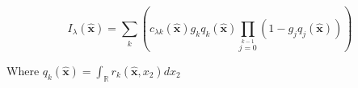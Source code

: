 
\begin{equation}
I_{\lambda}(\hat{\mathbf{x}})=
\sum\limits_{k}\limits^{} 
(
    c_{\lambda k}(\hat{\mathbf{x}})g_kq_k(\hat{\mathbf{x}})\prod\limits_{j=0}\limits^{k-1} (1-g_jq_j(\hat{\mathbf{x}}))
)\label{eq:splatting_equation}
\end{equation}

Where $q_k(\hat{\mathbf{x}}) = \int_{\mathbb{R}}r_k(\hat{\mathbf{x}},x_2)dx_2$ 

